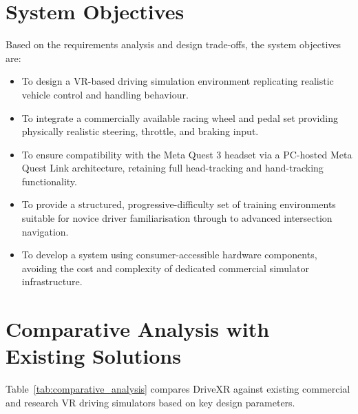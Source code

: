 \section{System Objectives}
Based on the requirements analysis and design trade-offs, the system objectives are:
\begin{itemize}
    \item To design a VR-based driving simulation environment replicating realistic vehicle control and handling behaviour.
    \item To integrate a commercially available racing wheel and pedal set providing physically realistic steering, throttle, and braking input.
    \item To ensure compatibility with the Meta Quest 3 headset via a PC-hosted Meta Quest Link architecture, retaining full head-tracking and hand-tracking functionality.
    \item To provide a structured, progressive-difficulty set of training environments suitable for novice driver familiarisation through to advanced intersection navigation.
    \item To develop a system using consumer-accessible hardware components, avoiding the cost and complexity of dedicated commercial simulator infrastructure.
\end{itemize}

\section{Comparative Analysis with Existing Solutions}

Table~\ref{tab:comparative_analysis} compares DriveXR against existing commercial and research VR driving simulators based on key design parameters.


